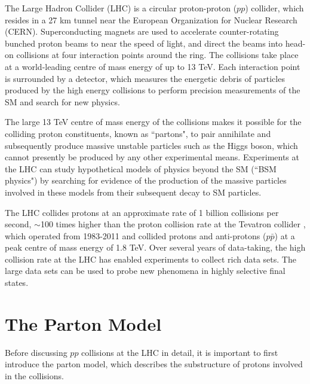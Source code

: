 \label{chapter:lhc_atlas}

The Large Hadron Collider (LHC) \cite{lhc_machine} is a circular proton-proton (\(pp\)) collider, which resides in a 27 km tunnel near the European Organization for Nuclear Research (CERN). Superconducting magnets are used to accelerate counter-rotating bunched proton beams to near the speed of light, and direct the beams into head-on collisions at four interaction points around the ring. The collisions take place at a world-leading centre of mass energy of up to 13 TeV. Each interaction point is surrounded by a detector, which measures the energetic debris of particles produced by the high energy collisions to perform precision measurements of the SM and search for new physics.

The large 13 TeV centre of mass energy of the collisions makes it possible for the colliding proton constituents, known as ``partons", to pair annihilate and subsequently produce massive unstable particles such as the Higgs boson, which cannot presently be produced by any other experimental means. Experiments at the LHC can study hypothetical models of physics beyond the SM (``BSM physics") by searching for evidence of the production of the massive particles involved in these models from their subsequent decay to SM particles.

The LHC collides protons at an approximate rate of 1 billion collisions per second, \(\sim\)100 times higher than the proton collision rate at the Tevatron collider \cite{tevatron}, which operated from 1983-2011 and collided protons and anti-protons (\(p\bar{p}\)) at a peak centre of mass energy of 1.8 TeV. Over several years of data-taking, the high collision rate at the LHC has enabled experiments to collect rich data sets. The large data sets can be used to probe new phenomena in highly selective final states.

\section{The Parton Model}
\label{sec:parton_model}

Before discussing \(pp\) collisions at the LHC in detail, it is important to first introduce the parton model, which describes the substructure of protons involved in the collisions. 

